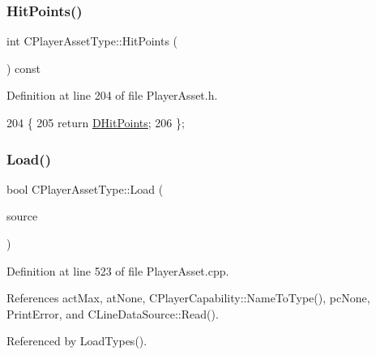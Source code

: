 \subsubsection{\texorpdfstring{Hit\+Points()}{HitPoints()}}
{\footnotesize\ttfamily int C\+Player\+Asset\+Type\+::\+Hit\+Points (\begin{DoxyParamCaption}{ }\end{DoxyParamCaption}) const\hspace{0.3cm}{\ttfamily [inline]}}



Definition at line 204 of file Player\+Asset.\+h.


\begin{DoxyCode}
204                              \{
205             \textcolor{keywordflow}{return} \hyperlink{classCPlayerAssetType_a0f10bff263838914bf347d9e9bf0af68}{DHitPoints};
206         \};
\end{DoxyCode}
\hypertarget{classCPlayerAssetType_a8e50738b1b451f4c870108777e6e3f90}{}\label{classCPlayerAssetType_a8e50738b1b451f4c870108777e6e3f90} 
\subsubsection{\texorpdfstring{Load()}{Load()}}
{\footnotesize\ttfamily bool C\+Player\+Asset\+Type\+::\+Load (\begin{DoxyParamCaption}\item[{std\+::shared\+\_\+ptr$<$ \hyperlink{classCDataSource}{C\+Data\+Source} $>$}]{source }\end{DoxyParamCaption})\hspace{0.3cm}{\ttfamily [static]}}



Definition at line 523 of file Player\+Asset.\+cpp.



References act\+Max, at\+None, C\+Player\+Capability\+::\+Name\+To\+Type(), pc\+None, Print\+Error, and C\+Line\+Data\+Source\+::\+Read().



Referenced by Load\+Types().


